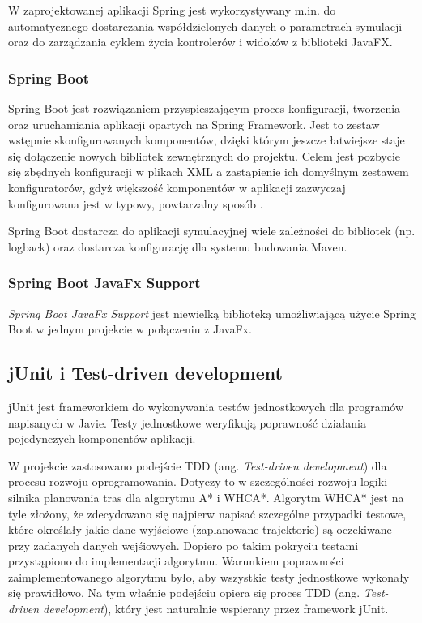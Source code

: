 W zaprojektowanej aplikacji Spring jest wykorzystywany m.in. do automatycznego dostarczania współdzielonych danych o parametrach symulacji oraz do zarządzania cyklem życia kontrolerów i widoków z biblioteki JavaFX.

\subsubsection{Spring Boot}
Spring Boot jest rozwiązaniem przyspieszającym proces konfiguracji, tworzenia oraz uruchamiania aplikacji opartych na Spring Framework.
Jest to zestaw wstępnie skonfigurowanych komponentów, dzięki którym jeszcze łatwiejsze staje się dołączenie nowych bibliotek zewnętrznych do projektu. Celem jest pozbycie się zbędnych konfiguracji w plikach XML a zastąpienie ich domyślnym zestawem konfiguratorów, gdyż większość komponentów w aplikacji zazwyczaj konfigurowana jest w typowy, powtarzalny sposób \cite{docs-springboot}.

Spring Boot dostarcza do aplikacji symulacyjnej wiele zależności do bibliotek (np. logback) oraz dostarcza konfigurację dla systemu budowania Maven.
\subsubsection{Spring Boot JavaFx Support}
{\it Spring Boot JavaFx Support} jest niewielką biblioteką umożliwiającą użycie Spring Boot w jednym projekcie w połączeniu z JavaFx.

\subsection{jUnit i Test-driven development}
jUnit jest frameworkiem do wykonywania testów jednostkowych dla programów napisanych w Javie. Testy jednostkowe weryfikują poprawność działania pojedynczych komponentów aplikacji.

W projekcie zastosowano podejście TDD (ang. {\it Test-driven development}) dla procesu rozwoju oprogramowania. Dotyczy to w szczególności rozwoju logiki silnika planowania tras dla algorytmu A* i WHCA*. Algorytm WHCA* jest na tyle złożony, że zdecydowano się najpierw napisać szczególne przypadki testowe, które określały jakie dane wyjściowe (zaplanowane trajektorie) są oczekiwane przy zadanych danych wejśiowych. Dopiero po takim pokryciu testami przystąpiono do implementacji algorytmu. Warunkiem poprawności zaimplementowanego algorytmu było, aby wszystkie testy jednostkowe wykonały się prawidłowo. Na tym właśnie podejściu opiera się proces TDD (ang. {\it Test-driven development}), który jest naturalnie wspierany przez framework jUnit.

